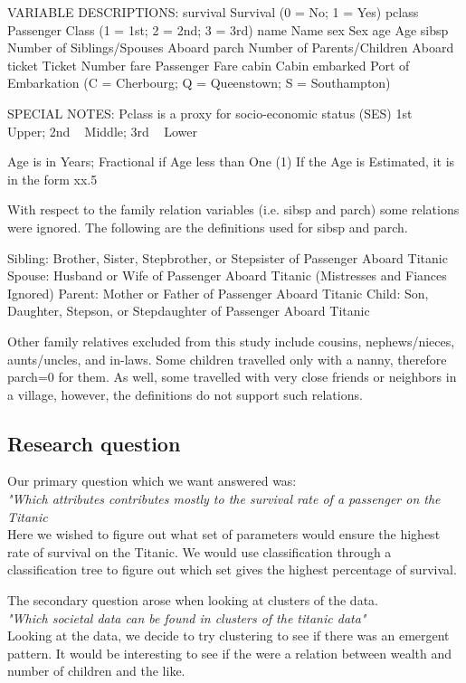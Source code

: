 \documentclass[a4paper,11pt]{article}
\begin{document}
VARIABLE DESCRIPTIONS:
survival        Survival
                (0 = No; 1 = Yes)
pclass          Passenger Class
                (1 = 1st; 2 = 2nd; 3 = 3rd)
name            Name
sex             Sex
age             Age
sibsp           Number of Siblings/Spouses Aboard
parch           Number of Parents/Children Aboard
ticket          Ticket Number
fare            Passenger Fare
cabin           Cabin
embarked        Port of Embarkation
                (C = Cherbourg; Q = Queenstown; S = Southampton)

SPECIAL NOTES:
Pclass is a proxy for socio-economic status (SES)
 1st ~ Upper; 2nd ~ Middle; 3rd ~ Lower

Age is in Years; Fractional if Age less than One (1)
 If the Age is Estimated, it is in the form xx.5

With respect to the family relation variables (i.e. sibsp and parch)
some relations were ignored.  The following are the definitions used
for sibsp and parch.

Sibling:  Brother, Sister, Stepbrother, or Stepsister of Passenger Aboard Titanic
Spouse:   Husband or Wife of Passenger Aboard Titanic (Mistresses and Fiances Ignored)
Parent:   Mother or Father of Passenger Aboard Titanic
Child:    Son, Daughter, Stepson, or Stepdaughter of Passenger Aboard Titanic

Other family relatives excluded from this study include cousins,
nephews/nieces, aunts/uncles, and in-laws.  Some children travelled
only with a nanny, therefore parch=0 for them.  As well, some
travelled with very close friends or neighbors in a village, however,
the definitions do not support such relations.
\subsection{Research question}
Our primary question which we want answered was:\\
\textit{"Which attributes contributes mostly to the survival rate of a passenger on the Titanic}\\
Here we wished to figure out what set of parameters would ensure the highest rate of survival on the Titanic. We would use classification through a classification tree to figure out which set gives the highest percentage of survival.

The secondary question arose when looking at clusters of the data.\\
\textit{"Which societal data can be found in clusters of the titanic data"}\\
Looking at the data, we decide to try clustering to see if there was an emergent pattern. It would be interesting to see if the were a relation between wealth and number of children and the like. 
\end{document}
